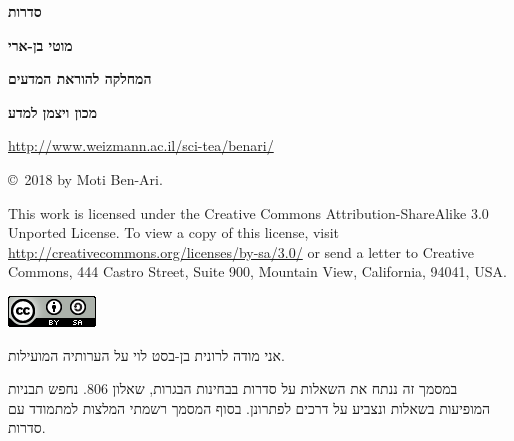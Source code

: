 \documentclass[12pt,a4paper]{article}
\begin{document}
\thispagestyle{empty}


\begin{center}
\textbf{\Huge סדרות}

\bigskip
\bigskip

\textbf{\Large מוטי בן-ארי}

\bigskip

\textbf{\Large המחלקה להוראת המדעים}

\bigskip

\textbf{\Large מכון ויצמן למדע}

\bigskip

\url{http://www.weizmann.ac.il/sci-tea/benari/}

\bigskip

\end{center}


\begin{center}
\sffamily\copyright{}\  2018 by Moti Ben-Ari.
\end{center}

\begin{footnotesize}
\sffamily
This work is licensed under the Creative Commons Attribution-ShareAlike 3.0 Unported License. To view a copy of this license, visit \url{http://creativecommons.org/licenses/by-sa/3.0/} or send a letter to Creative Commons, 444 Castro Street, Suite 900, Mountain View, California, 94041, USA.
\end{footnotesize}

\bigskip

\begin{center}
\includegraphics[width=.2\textwidth]{../../by-sa.png}
\end{center}

\bigskip
\bigskip
\bigskip


אני מודה לרונית בן-בסט לוי על הערותיה המועילות.
\newpage


במסמך זה ננתח את השאלות על סדרות בבחינות הבגרות, שאלון
$806$.
נחפש תבניות המופיעות בשאלות ונצביע על דרכים לפתרונן. בסוף המסמך רשמתי המלצות למתמודד עם סדרות.


\end{document}
